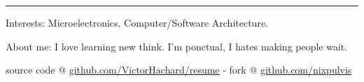 \documentclass[10pt,letterpaper]{article}
\newenvironment{indentsection}[1]
{\begin{list}{}
  {\setlength{\leftmargin}{#1}} \item[]
}
{\end{list}}
\begin{document}
\hrule
\begin{indentsection}{\parindent}
\begin{description*}
\item[Interests:]
  Microelectronics, Computer/Software Architecture.
\item[About me:]
  I love learning new think. I’m ponctual, I hates making people wait.
\end{description*}
\end{indentsection}


\begin{center}
\footnotesize source code @
\href{http://www.github.com/VictorHachard/resume}
{github.com/VictorHachard/resume} - fork @
\href{http://www.github.com/nixpulvis}
{github.com/nixpulvis}
\end{center}
\end{document}
